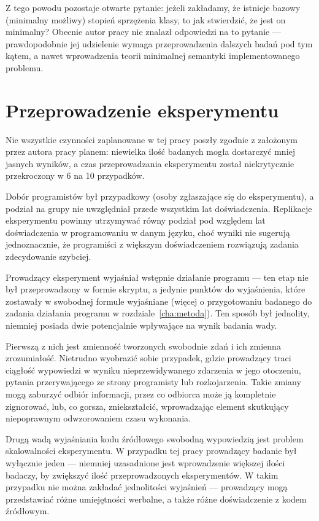Z tego powodu pozostaje otwarte pytanie: jeżeli zakładamy, że istnieje
bazowy (minimalny możliwy) stopień sprzężenia klasy, to jak stwierdzić,
że jest on minimalny?
Obecnie autor pracy nie znalazł odpowiedzi na to pytanie --- prawdopodobnie
jej udzielenie wymaga przeprowadzenia dalszych badań pod tym kątem,
a nawet wprowadzenia teorii minimalnej semantyki implementowanego problemu.

\section{Przeprowadzenie eksperymentu}

Nie wszystkie czynności zaplanowane w tej pracy poszły zgodnie z założonym
przez autora pracy planem: niewielka ilość badanych mogła dostarczyć mniej
jasnych wyników, a czas przeprowadzania eksperymentu został niekrytycznie
przekroczony w 6 na 10 przypadków.

Dobór programistów był przypadkowy (osoby zgłaszające się do eksperymentu),
a podział na grupy nie uwzględniał przede wszystkim lat doświadczenia.
Replikacje eksperymentu powinny utrzymywać równy podział pod względem
lat doświadczenia w programowaniu w danym języku, choć wyniki nie sugerują
jednoznacznie, że programiści z większym doświadczeniem rozwiązują zadania
zdecydowanie szybciej.

Prowadzący eksperyment wyjaśniał wstępnie działanie programu --- ten etap
nie był przeprowadzony w formie skryptu, a jedynie punktów do wyjaśnienia,
które zostawały w swobodnej formule wyjaśniane (więcej o przygotowaniu
badanego do zadania działania programu w rozdziale~\ref{cha:metoda}).
Ten sposób był jednolity, niemniej posiada dwie potencjalnie wpływające
na wynik badania wady.

Pierwszą z nich jest zmienność tworzonych swobodnie zdań i ich zmienna
zrozumiałość.
Nietrudno wyobrazić sobie przypadek, gdzie prowadzący traci ciągłość
wypowiedzi w wyniku nieprzewidywanego zdarzenia w jego otoczeniu, pytania
przerywającego ze strony programisty lub rozkojarzenia.
Takie zmiany mogą zaburzyć odbiór informacji, przez co odbiorca może ją
kompletnie zignorować, lub, co gorsza, zniekształcić, wprowadzając element
skutkujący niepoprawnym odwzorowaniem czasu wykonania.

Drugą wadą wyjaśniania kodu źródłowego swobodną wypowiedzią jest problem
skalowalności eksperymentu.
W przypadku tej pracy prowadzący badanie był wyłącznie jeden --- niemniej
uzasadnione jest wprowadzenie większej ilości badaczy, by zwiększyć ilość
przeprowadzonych eksperymentów.
W takim przypadku nie można zakładać jednolitości wyjaśnień --- prowadzący
mogą przedstawiać różne umiejętności werbalne, a także różne doświadczenie z
kodem źródłowym.

